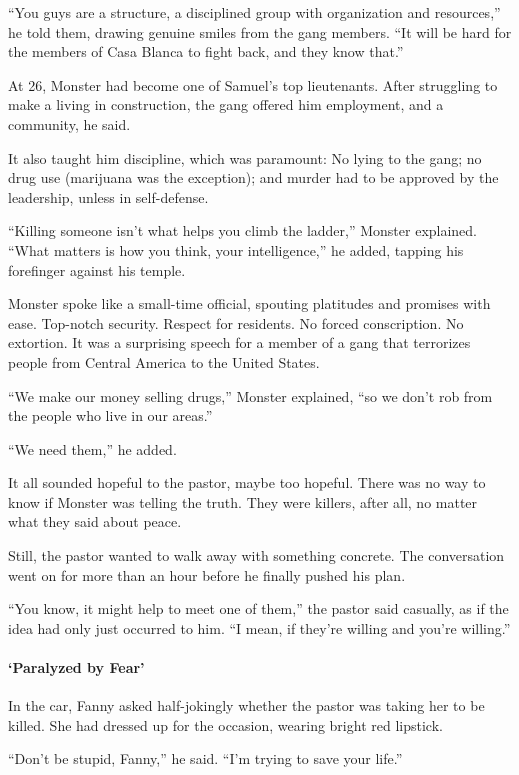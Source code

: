 ``You guys are a structure, a disciplined group with organization and
resources,'' he told them, drawing genuine smiles from the gang members.
``It will be hard for the members of Casa Blanca to fight back, and they
know that.''

At 26, Monster had become one of Samuel's top lieutenants. After
struggling to make a living in construction, the gang offered him
employment, and a community, he said.

It also taught him discipline, which was paramount: No lying to the
gang; no drug use (marijuana was the exception); and murder had to be
approved by the leadership, unless in self-defense.

``Killing someone isn't what helps you climb the ladder,'' Monster
explained. ``What matters is how you think, your intelligence,'' he
added, tapping his forefinger against his temple.

Monster spoke like a small-time official, spouting platitudes and
promises with ease. Top-notch security. Respect for residents. No forced
conscription. No extortion. It was a surprising speech for a member of a
gang that terrorizes people from Central America to the United States.

``We make our money selling drugs,'' Monster explained, ``so we don't
rob from the people who live in our areas.''

``We need them,'' he added.

It all sounded hopeful to the pastor, maybe too hopeful. There was no
way to know if Monster was telling the truth. They were killers, after
all, no matter what they said about peace.

Still, the pastor wanted to walk away with something concrete. The
conversation went on for more than an hour before he finally pushed his
plan.

``You know, it might help to meet one of them,'' the pastor said
casually, as if the idea had only just occurred to him. ``I mean, if
they're willing and you're willing.''

\hypertarget{paralyzed-by-fear}{%
\paragraph{`Paralyzed by Fear'}\label{paralyzed-by-fear}}

In the car, Fanny asked half-jokingly whether the pastor was taking her
to be killed. She had dressed up for the occasion, wearing bright red
lipstick.

``Don't be stupid, Fanny,'' he said. ``I'm trying to save your life.''


